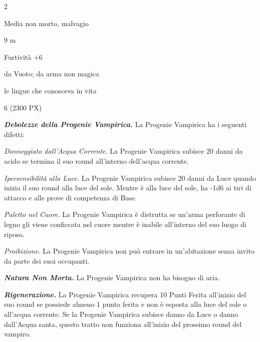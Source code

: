 \begin{multicols}{2}
{
\begin{description}[noitemsep, topsep=0pt, parsep=0pt, partopsep=0pt, itemsep=1pt, leftmargin=2.35cm,  labelwidth=2.2cm, itemindent=0cm, listparindent=0pt] %
\setlength{\baselineskip}{10pt}
\item[\textbf{Taglia/Tipo}] Media non morto, malvagio
\item[\textbf{Movimento}] 9 m
\item[\textbf{Tiri Salvez.}] 
\item[\textbf{Caratt.}] 
\item[\textbf{Punti Ferita}] 
\item[\textbf{Comp.}] Furtività +6
\item[\textbf{Res. Danni}] da Vuoto; da arma non magica
\item[\textbf{Sensi}] 
\item[\textbf{Linguaggi}] le lingue che conosceva in vita
\item[\textbf{Sfida}] 6 (2300 PX)
\end{description}
\smallskip

\emph{\textbf{Debolezze della Progenie Vampirica.}} La Progenie Vampirica ha i seguenti difetti:

\emph{Danneggiato dall'Acqua Corrente.} La Progenie Vampirica subisce 20 danni da acido se termina il suo round all'interno dell'acqua corrente.

\emph{Ipersensibilità alla Luce.} La Progenie Vampirica subisce 20 danni da Luce quando inizia il suo round alla luce del sole. Mentre è alla luce del sole, ha -1d6 ai tiri di attacco e alle prove di competenza di Base.

\emph{Paletto nel Cuore.} La Progenie Vampirica è distrutta se un'arma perforante di legno gli viene conficcata nel cuore mentre è inabile all'interno del suo luogo di riposo.

\emph{Proibizione.} La Progenie Vampirica non può entrare in un'abitazione senza invito da parte dei suoi occupanti.

\emph{\textbf{Natura Non Morta.}} La Progenie Vampirica non ha bisogno di aria.

\emph{\textbf{Rigenerazione.}} La Progenie Vampirica recupera 10 Punti Ferita all'inizio del suo round se possiede almeno 1 punto ferita e non è esposta alla luce del sole o all'acqua corrente. Se la Progenie Vampirica subisce danno da Luce o danno dall'Acqua santa, questo tratto non funziona all'inizio del prossimo round del vampiro.

}
\end{multicols}
